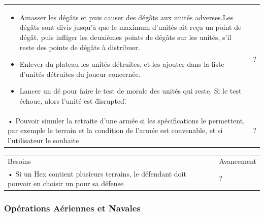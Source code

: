\begin{center}
\begin{tabular}[h]{|m{14cm}|m{2cm}|}
\begin{itemize}
            \item Amasser les dégâts et puis causer des dégâts aux unités adverses.\newline Les dégâts sont divis jusqu'à que le maximum d'unités ait reçu un point de dégât, puis infliger les deuxièmes points de dégâts sur les unités, s'il reste des points de dégâts à distribuer.
            \item Enlever du plateau les unités détruites, et les ajouter dans la liste d'unités détruites du joueur concernée.
            \item Lancer un dé pour faire le test de morale des unités qui reste. Si le test échoue, alors l'unité est \"disrupted\".
        \end{itemize}                                                                                                                                                       & ?          \\
        • Pouvoir simuler la retraite d'une armée si les spécifications le permettent, par exemple le terrain et la condition de l'armée est convenable, et si l'utilisateur le souhaite & ?          \\
        \hline
    \end{tabular}
\end{center}

\begin{center}
    \centering
    \begin{tabular}[h]{|m{14cm}|m{2cm}|}
        \hline
        \rowcolor[HTML]{C0D8C0}
        \multicolumn{2}{|c|}{\textbf{Priorité 1/3}}                                                                   \\
        \hline
        Besoins                                                                                          & Avancement \\
        \hline
        • Si un Hex contient plusieurs terrains, le défendant doit pouvoir en choisir un pour sa défense & ?          \\
        \hline
    \end{tabular}
\end{center}

\subsubsection{Opérations Aériennes et Navales}

